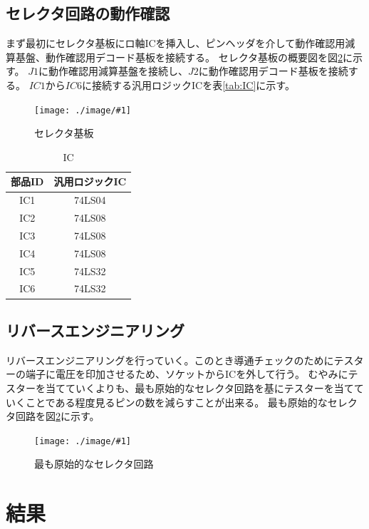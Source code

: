 \documentclass[a4paper,11pt]{ltjsarticle}
\newcommand{\fig}[4]{
    \begin{figure}[htbp]
      \centering
      \texttt{[image: ./image/\#1]}
      \caption{#2}
      \label{fig:#3}
    \end{figure}
  }
\begin{document}
\subsection{セレクタ回路の動作確認}
まず最初にセレクタ基板にロ軸ICを挿入し、ピンヘッダを介して動作確認用減算基盤、動作確認用デコード基板を接続する。
セレクタ基板の概要図を図\ref{fig:selector}に示す。
$J1$に動作確認用減算基盤を接続し、$J2$に動作確認用デコード基板を接続する。
$IC1$から$IC6$に接続する汎用ロジックICを表\ref{tab:IC}に示す。
\fig{kiban.drawio.png}{セレクタ基板}{selector}{0.6}
\begin{table}[htbp]
  \centering
  \caption{IC}
  \begin{tabular}{|c|c|}
    \hline
    部品ID  &  汎用ロジックIC  \\
    \hline
    IC1  &  74LS04  \\
    IC2  &  74LS08  \\
    IC3  &  74LS08  \\
    IC4  &  74LS08  \\
    IC5  &  74LS32  \\
    IC6  &  74LS32  \\
    \hline
  \end{tabular}
\end{table}
\newpage
\subsection{リバースエンジニアリング}
リバースエンジニアリングを行っていく。このとき導通チェックのためにテスターの端子に電圧を印加させるため、ソケットからICを外して行う。
むやみにテスターを当てていくよりも、最も原始的なセレクタ回路を基にテスターを当てていくことである程度見るピンの数を減らすことが出来る。
最も原始的なセレクタ回路を図\ref{fig:selector}に示す。
\fig{selector.png}{最も原始的なセレクタ回路}{selector}{1}
\section{結果}
\end{document}

